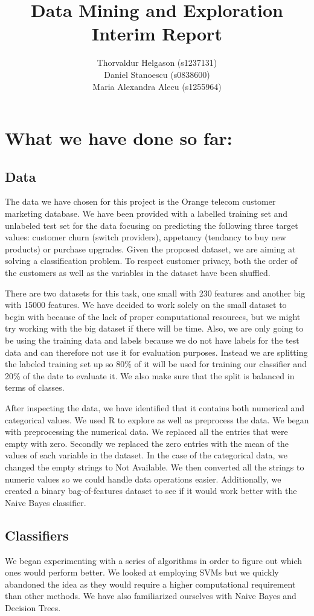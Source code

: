 \documentclass[a4paper,11pt]{article}
\title{Data Mining and Exploration\\Interim Report}
\author{Thorvaldur Helgason (s1237131) \\
Daniel Stanoescu (s0838600) \\
Maria Alexandra Alecu (s1255964)}
\begin{document}
    
\maketitle

\section*{What we have done so far:}
\subsection*{Data}
The data we have chosen for this project is the Orange telecom customer marketing database. We have been provided with a labelled training set and unlabeled test set for the data focusing on predicting the following three target values: customer churn (switch providers), appetancy (tendancy to buy new products) or purchase upgrades. Given the proposed dataset, we are aiming at solving a classification problem. To respect customer privacy, both the order of the customers as well as the variables in the dataset have been shuffled.

There are two datasets for this task, one small with 230 features and another big with 15000 features. We have decided to work solely on the small dataset to begin with because of the lack of proper computational resources, but we might try working with the big dataset if there will be time. Also, we are only going to be using the training data and labels because we do not have labels for the test data and can therefore not use it for evaluation purposes. Instead we are splitting the labeled training set up so 80\% of it will be used for training our classifier and 20\% of the date to evaluate it. We also make sure that the split is balanced in terms of classes.

After inspecting the data, we have identified that it contains both numerical and categorical values. We used R to explore as well as preprocess the data. We began with preprocessing the numerical data. We replaced all the entries that were empty with zero. Secondly we replaced the zero entries with the mean of the values of each variable in the dataset. In the case of the categorical data, we changed the empty strings to Not Available. We then converted all the strings to numeric values so we could handle data operations easier. Additionally, we created a binary bag-of-features dataset to see if it would work better with the Naive Bayes classifier. 


\subsection*{Classifiers}
We began experimenting with a series of algorithms in order to figure out which ones would perform better. We looked at employing SVMs but we quickly abandoned the idea as they would require a higher computational requirement than other methods. We have also familiarized ourselves with Naive Bayes and Decision Trees.
\end{document}
